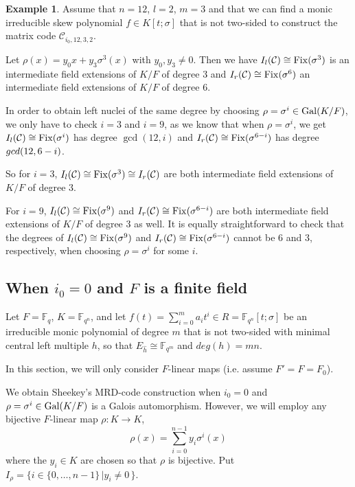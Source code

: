 \documentclass[12pt]{amsart}
\theoremstyle{plain}
\theoremstyle{definition}
\newtheorem{example}[theorem]{Example}
\numberwithin{equation}{section}
\numberwithin{figure}{section}
\begin{document}
 \begin{example}
Assume that $n=12$, $l=2$, $m=3$ and that we can find a monic irreducible skew polynomial $f\in K[t;\sigma]$ that is not two-sided to construct the matrix code $\mathcal{C}_{i_0,12,3,2}$.

Let $\rho(x) = y_0 x + y_3 \sigma^3(x)$ with $y_0, y_3 \neq 0$. Then we have $I_l(\mathcal{C})\cong {\rm Fix}(\sigma^3)$ is an intermediate field extensions of $K/F$  of degree 3 and  $I_r(\mathcal{C})\cong {\rm Fix}(\sigma^{6})$ an intermediate field extensions of $K/F$ of degree 6.

 In order to obtain left nuclei of the same degree by choosing $\rho=\sigma^i\in {\rm Gal}(K/F)$, we only have to check $i=3$ and $i=9$, as we know that
when $\rho=\sigma^i$, we get $I_l(\mathcal{C})\cong {\rm Fix}(\sigma^i)$ has degree $\gcd (12,i)$ and $I_r(\mathcal{C})\cong {\rm Fix}(\sigma^{6-i})$ has degree $\\gcd (12,6-i)$.

 So for $i=3$, $I_l(\mathcal{C})\cong {\rm Fix}(\sigma^3)\cong I_r(\mathcal{C})$ are both intermediate field extensions of $K/F$ of degree $3$.

 For $i=9$, $I_l(\mathcal{C})\cong {\rm Fix}(\sigma^9)$  and
 $I_r(\mathcal{C})\cong {\rm Fix}(\sigma^{6-i})$ are both intermediate field extensions of $K/F$ of degree 3 as well.
 It is equally straightforward to check that  the degrees of $I_l(\mathcal{C})\cong {\rm Fix}(\sigma^9)$  and
 $I_r(\mathcal{C})\cong {\rm Fix}(\sigma^{6-i})$ cannot be 6 and 3, respectively, when choosing $\rho=\sigma^i$ for some $i$.
\end{example}



\subsection{When $i_0=0$ and $F$ is a finite field}
Let $F=\mathbb{F}_{q}$, $K=\mathbb{F}_{q^n}$, and let $f(t)=\sum_{i=0}^ma_it^i\in R=\mathbb{F}_{q^n}[t;\sigma]$ be an irreducible monic polynomial of degree $m$ that is not two-sided with minimal central left multiple $h$, so that $E_{\hat{h}}\cong \mathbb{F}_{q^m}$ and $deg(h)=mn$.

In this section, we will only consider $F$-linear maps (i.e. assume $F'=F=F_0$).

We obtain Sheekey's MRD-code construction when $i_0=0$ and $\rho=\sigma^i\in {\rm Gal}(K/F)$ is a Galois automorphism. However, we will employ any bijective $F$-linear map $\rho:K\to K$,
 $$\rho(x)= \sum_{i=0}^{n-1}y_i\sigma^i(x)$$
  where the $y_i\in K$ are  chosen so that $\rho$ is bijective. Put $I_\rho=\{i\in \{0,\dots, n-1\}\,| y_i\not=0\, \}$.
\end{document}
